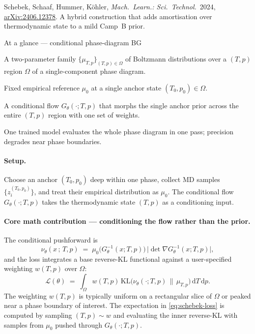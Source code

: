 \documentclass[11pt,letterpaper]{article}
\newcommand{\KLdiv}{\mathrm{KL}}
\newcommand{\dd}{\mathrm{d}}
\theoremstyle{plain}
\begin{document}
Schebek, Schaaf, Hummer, Köhler, \emph{Mach.\ Learn.: Sci.\ Technol.}\ 2024,
\href{https://arxiv.org/abs/2406.12378}{arXiv:2406.12378}. A hybrid
construction that adds amortisation over thermodynamic state to a mild
Camp~B prior.

\begin{methodbox}{At a glance --- conditional phase-diagram BG}
\begin{description}[leftmargin=2.2em,style=nextline,itemsep=0pt,topsep=2pt]
  \item[Target] A two-parameter family
    $\{\mu_{T,p}\}_{(T,p)\in\Omega}$ of Boltzmann distributions over a
    $(T,p)$ region $\Omega$ of a single-component phase diagram.
  \item[Prior] Fixed empirical reference $\mu_0$ at a single anchor state
    $(T_0,p_0)\in\Omega$.
  \item[New idea] A conditional flow $G_\theta(\cdot;T,p)$ that morphs
    the single anchor prior across the entire $(T,p)$ region with one set
    of weights.
  \item[Headline] One trained model evaluates the whole phase diagram in
    one pass; precision degrades near phase boundaries.
\end{description}
\end{methodbox}

\paragraph{Setup.} Choose an anchor $(T_0, p_0)$ deep within one phase,
collect MD samples $\{z_i^{(T_0,p_0)}\}$, and treat their empirical
distribution as $\mu_0$. The conditional flow $G_\theta(\cdot;T,p)$ takes
the thermodynamic state $(T,p)$ as a conditioning input.

\paragraph{Core math contribution --- conditioning the flow rather than
the prior.} The conditional pushforward is
\begin{equation}\label{eq:schebek-push}
  \nu_\theta(x\,;\,T,p) \;=\; \mu_0\!\big(G_\theta^{-1}(x;T,p)\big)\,\big|\det\nabla G_\theta^{-1}(x;T,p)\big|,
\end{equation}
and the loss integrates a base reverse-KL functional against a
user-specified weighting $w(T,p)$ over $\Omega$:
\begin{equation}\label{eq:schebek-loss}
  \mathcal L(\theta) \;=\; \int_\Omega w(T,p)\,\KLdiv\!\Big(\nu_\theta(\cdot;T,p)\,\Big\|\,\mu_{T,p}\Big)\,\dd T\,\dd p.
\end{equation}
The weighting $w(T,p)$ is typically uniform on a rectangular slice of
$\Omega$ or peaked near a phase boundary of interest. The expectation in
\eqref{eq:schebek-loss} is computed by sampling $(T,p)\sim w$ and
evaluating the inner reverse-KL with samples from $\mu_0$ pushed through
$G_\theta(\cdot;T,p)$.
\end{document}
